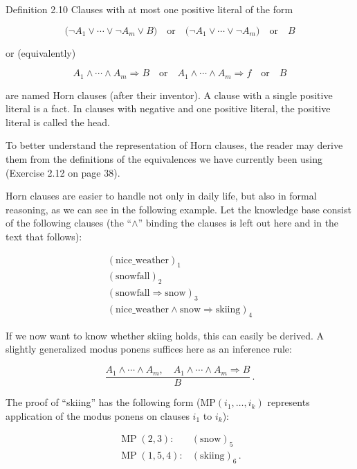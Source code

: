 \documentclass[10pt]{book}
\begin{document}
Definition 2.10 Clauses with at most one positive literal of the form

$$
\bigl(\neg A_{1} \vee \cdots \vee \neg A_{m} \vee B\bigr) \quad \text{or} \quad \bigl(\neg A_{1} \vee \cdots \vee \neg A_{m}\bigr) \quad \text{or} \quad B
$$

or (equivalently)

$$
A_{1} \wedge \cdots \wedge A_{m} \Rightarrow B \quad \text{or} \quad A_{1} \wedge \cdots \wedge A_{m} \Rightarrow f \quad \text{or} \quad B
$$

are named Horn clauses (after their inventor). A clause with a single positive literal is a fact. In clauses with negative and one positive literal, the positive literal is called the head.

To better understand the representation of Horn clauses, the reader may derive them from the definitions of the equivalences we have currently been using (Exercise 2.12 on page 38).

Horn clauses are easier to handle not only in daily life, but also in formal reasoning, as we can see in the following example. Let the knowledge base consist of the following clauses (the ``$\wedge$'' binding the clauses is left out here and in the text that follows):

\[
\begin{array}{l}
(\text{nice\_weather})_{1} \\
(\text{snowfall})_{2} \\
(\text{snowfall} \Rightarrow \text{snow})_{3} \\
(\text{nice\_weather} \wedge \text{snow} \Rightarrow \text{skiing})_{4}
\end{array}
\]

If we now want to know whether skiing holds, this can easily be derived. A slightly generalized modus ponens suffices here as an inference rule:

$$
\frac{A_{1} \wedge \cdots \wedge A_{m}, \quad A_{1} \wedge \cdots \wedge A_{m} \Rightarrow B}{B}\, .
$$

The proof of ``skiing'' has the following form ($\mathrm{MP}(i_{1}, \ldots, i_{k})$ represents application of the modus ponens on clauses $i_{1}$ to $i_{k}$):

$$
\begin{array}{ll}
\operatorname{MP}(2,3): & (\text{snow})_{5} \\
\operatorname{MP}(1,5,4): & (\text{skiing})_{6}\, .
\end{array}
$$
\end{document}
